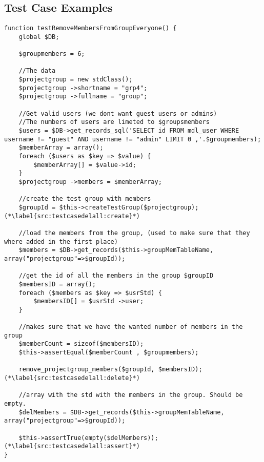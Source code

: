 \subsection{Test Case Examples}
\begin{lstlisting}[style=phpCode, caption=\myCaption{A test case for the function remove\_projectgroup\_members. The test case tests if the function correctly removes all the members of the project group when instructed to.}, label=src:testcasedelall]
function testRemoveMembersFromGroupEveryone() {
    global $DB;
    
    $groupmembers = 6;
    
    //The data
    $projectgroup = new stdClass(); 
    $projectgroup ->shortname = "grp4";
    $projectgroup ->fullname = "group";
    
    //Get valid users (we dont want guest users or admins)
    //The numbers of users are limeted to $groupsmembers
    $users = $DB->get_records_sql('SELECT id FROM mdl_user WHERE username != "guest" AND username != "admin" LIMIT 0 ,'.$groupmembers);
    $memberArray = array();
    foreach ($users as $key => $value) {
        $memberArray[] = $value->id;
    }
    $projectgroup ->members = $memberArray;
    
    //create the test group with members
    $groupId = $this->createTestGroup($projectgroup); (*\label{src:testcasedelall:create}*)
    
    //load the members from the group, (used to make sure that they where added in the first place)
    $members = $DB->get_records($this->groupMemTableName, array("projectgroup"=>$groupId));
    
    //get the id of all the members in the group $groupID
    $membersID = array();
    foreach ($members as $key => $usrStd) {
        $membersID[] = $usrStd ->user;
    } 
    
    //makes sure that we have the wanted number of members in the group
    $memberCount = sizeof($membersID);
    $this->assertEqual($memberCount , $groupmembers);
    
    remove_projectgroup_members($groupId, $membersID); (*\label{src:testcasedelall:delete}*)
    
    //array with the std with the members in the group. Should be empty.
    $delMembers = $DB->get_records($this->groupMemTableName, array("projectgroup"=>$groupId));
    
    $this->assertTrue(empty($delMembers)); (*\label{src:testcasedelall:assert}*)
}
\end{lstlisting}

